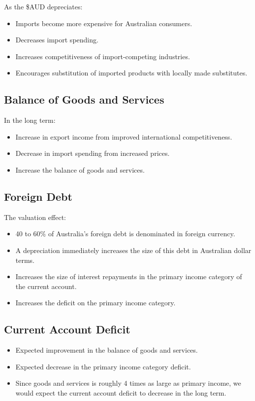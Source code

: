 \documentclass[a4paper,11pt]{report}
\begin{document}
As the \$AUD depreciates:

\begin{itemize}
\item Imports become more expensive for Australian consumers.
\item Decreases import spending.
\item Increases competitiveness of import-competing industries.
\item Encourages substitution of imported products with locally made
	substitutes.
\end{itemize}

\subsection{Balance of Goods and Services}

In the long term:

\begin{itemize}
\item Increase in export income from improved international competitiveness.
\item Decrease in import spending from increased prices.
\item Increase the balance of goods and services.
\end{itemize}

\subsection{Foreign Debt}

The valuation effect:

\begin{itemize}
\item 40 to 60\% of Australia's foreign debt is denominated in foreign currency.
\item A depreciation immediately increases the size of this debt in Australian
	dollar terms.
\item Increases the size of interest repayments in the primary income category
	of the current account.
\item Increases the deficit on the primary income category.
\end{itemize}

\subsection{Current Account Deficit}

\begin{itemize}
\item Expected improvement in the balance of goods and services.
\item Expected decrease in the primary income category deficit.
\item Since goods and services is roughly 4 times as large as primary income,
	we would expect the current account deficit to decrease in the long term.
\end{itemize}
\end{document}
